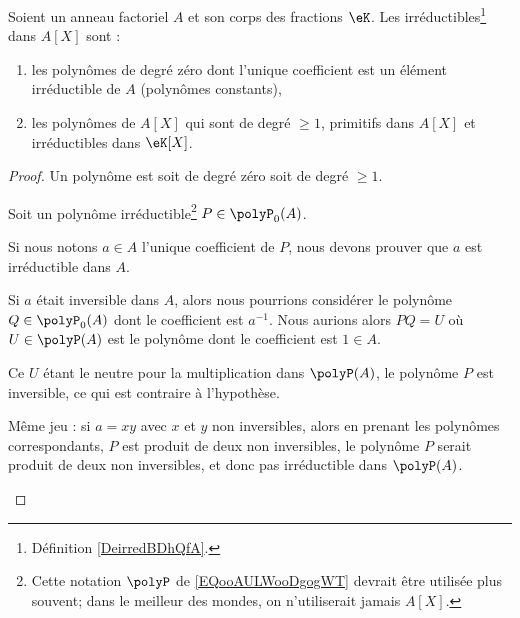 \begin{theorem}		\label{THOooJESZooNqScLF}
	Soient un anneau factoriel \( A\) et son corps des fractions \( \eK\). Les irréductibles\footnote{Définition \ref{DeirredBDhQfA}.} dans \( A[X]\) sont :
	\begin{enumerate}
		\item
		      les polynômes de degré zéro dont l'unique coefficient est un élément irréductible de \( A\) (polynômes constants),
		\item		\label{ITEMooVKOOooDeGYYz}
		      les polynômes de \( A[X]\) qui sont de degré \( \geq 1\), primitifs dans \( A[X]\) et irréductibles dans \( \eK[X]\).
	\end{enumerate}
\end{theorem}

\begin{proof}
	Un polynôme est soit de degré zéro soit de degré \( \geq 1\).

	\begin{subproof}

		Soit un polynôme irréductible\footnote{Cette notation \( \polyP\) de \eqref{EQooAULWooDgogWT} devrait être utilisée plus souvent; dans le meilleur des mondes, on n'utiliserait jamais \( A[X]\).} \( P\in \polyP_0(A)\).

		Si nous notons \( a\in A\) l'unique coefficient de \( P\), nous devons prouver que \( a\) est irréductible dans \( A\).

		\begin{subproof}
			Si \( a\) était inversible dans \( A\), alors nous pourrions considérer le polynôme \( Q\in \polyP_0(A)\) dont le coefficient est \( a^{-1}\). Nous aurions alors \( PQ=U\) où \( U\in\polyP(A)\) est le polynôme dont le coefficient est \( 1\in A\).

			Ce \( U\) étant le neutre pour la multiplication dans \( \polyP(A)\), le polynôme \( P\) est inversible, ce qui est contraire à l'hypothèse.

			Même jeu : si \( a=xy\) avec \( x\) et \( y\) non inversibles, alors en prenant les polynômes correspondants, \( P\) est produit de deux non inversibles, le polynôme \( P\) serait produit de deux non inversibles, et donc pas irréductible dans \( \polyP(A)\).
		\end{subproof}


\end{subproof}
\end{proof}
